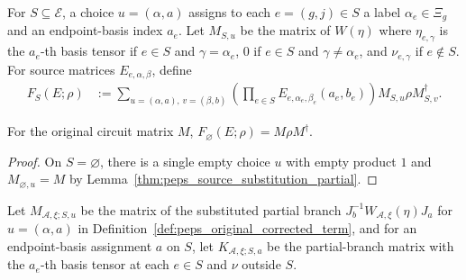 \begin{definition}
    \label{def:peps_original_corrected_term}
    \leanok
    For $S\subseteq\mathcal E$, a choice $u=(\alpha,a)$ assigns to each
    $e=(g,j)\in S$ a label $\alpha_e\in\Xi_g$ and an endpoint-basis index $a_e$.
    Let $M_{S,u}$ be the matrix of $W(\eta)$ where $\eta_{e,\gamma}$ is the
    $a_e$-th basis tensor if $e\in S$ and $\gamma=\alpha_e$, $0$ if $e\in S$ and
    $\gamma\neq\alpha_e$, and $\nu_{e,\gamma}$ if $e\notin S$. For source
    matrices $E_{e,\alpha,\beta}$, define
    \begin{align}
        F_S(E;\rho)
         & :=\sum_{u=(\alpha,a),\,v=(\beta,b)}
        \left(\prod_{e\in S}E_{e,\alpha_e,\beta_e}(a_e,b_e)\right)
        M_{S,u}\rho M_{S,v}^{\dagger}.
        \label{eq:peps_original_corrected_term}
    \end{align}
\end{definition}

\begin{lemma}
    \label{thm:peps_corrected_empty}
    \leanok
    For the original circuit matrix $M$, $F_\varnothing(E;\rho)=M\rho M^\dagger$.
\end{lemma}
\begin{proof}
    \leanok
    On $S=\varnothing$, there is a single empty choice $u$ with empty product
    $1$ and $M_{\varnothing,u}=M$ by Lemma~\ref{thm:peps_source_substitution_partial}.
\end{proof}

\begin{definition}
    \label{def:peps_partial_basis_substitution}
    \leanok
    Let $M_{\mathcal A,\xi;S,u}$ be the matrix of the substituted partial branch
    $J_b^{-1}W_{\mathcal A,\xi}(\eta)J_a$ for $u=(\alpha,a)$ in
    Definition~\ref{def:peps_original_corrected_term}, and for an endpoint-basis
    assignment $a$ on $S$, let $K_{\mathcal A,\xi;S,a}$ be the partial-branch
    matrix with the $a_e$-th basis tensor at each $e\in S$ and $\nu$ outside $S$.
\end{definition}

